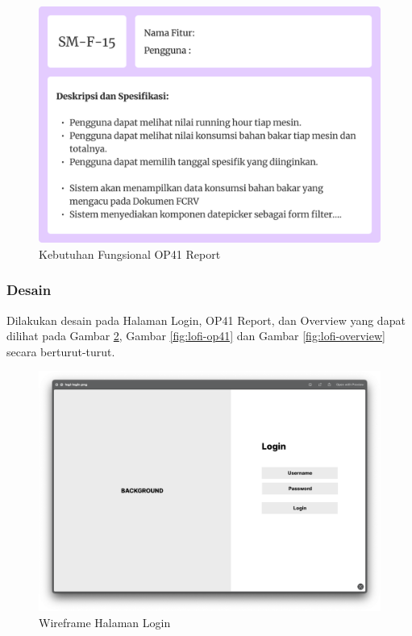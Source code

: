\begin{figure}[!h]
    \includegraphics[width=1\linewidth, center]{images/hasil/iterations/5/fr-op41.png}
    \caption{Kebutuhan Fungsional OP41 Report}
    \label{fig:fr-op41}
\end{figure}

\newpage

\subsubsection{Desain}

Dilakukan desain pada Halaman Login, OP41 Report, dan Overview yang dapat dilihat pada Gambar \ref{fig:lofi-login}, Gambar \ref{fig:lofi-op41} dan Gambar \ref{fig:lofi-overview} secara berturut-turut.

\begin{figure}[!h]
    \includegraphics[width=1.05\linewidth, center]{images/hasil/iterations/5/lofi-login.png}
    \caption{Wireframe Halaman Login}
    \label{fig:lofi-login}
\end{figure}

